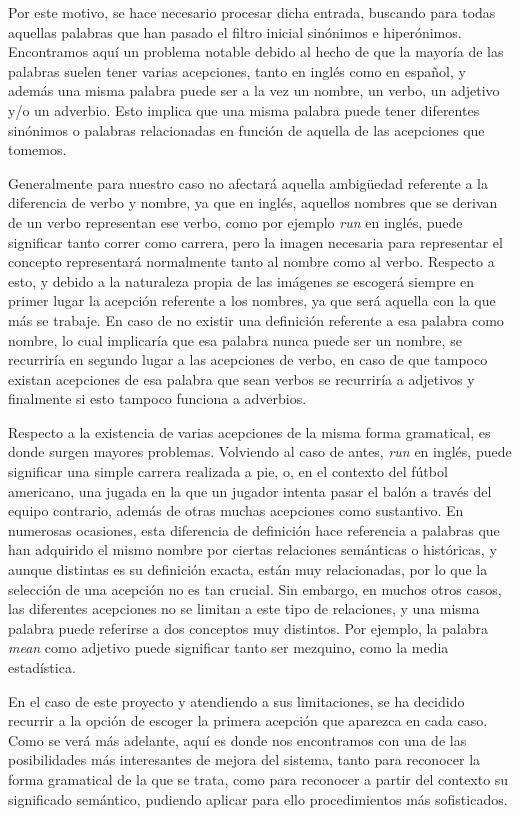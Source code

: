 Por este motivo, se hace necesario procesar dicha entrada, buscando para todas aquellas palabras que han pasado el filtro inicial sinónimos e hiperónimos. Encontramos aquí un problema notable debido al hecho de que la mayoría de las palabras suelen tener varias acepciones, tanto en inglés como en español, y además una misma palabra puede ser a la vez un nombre, un verbo, un adjetivo y/o un adverbio. Esto implica que una misma palabra puede tener diferentes sinónimos o palabras relacionadas en función de aquella de las acepciones que tomemos.

Generalmente para nuestro caso no afectará aquella ambigüedad referente a la diferencia de verbo y nombre, ya que en inglés, aquellos nombres que se derivan de un verbo representan ese verbo, como por ejemplo \textit{run} en inglés, puede significar tanto correr como carrera, pero la imagen necesaria para representar el concepto representará normalmente tanto al nombre como al verbo. Respecto a esto, y debido a la naturaleza propia de las imágenes se escogerá siempre en primer lugar la acepción referente a los nombres, ya que será aquella con la que más se trabaje. En caso de no existir una definición referente a esa palabra como nombre, lo cual implicaría que esa palabra nunca puede ser un nombre, se recurriría en segundo lugar a las acepciones de verbo, en caso de que tampoco existan acepciones de esa palabra que sean verbos se recurriría a adjetivos y finalmente si esto tampoco funciona a adverbios. 

Respecto a la existencia de varias acepciones de la misma forma gramatical, es donde surgen mayores problemas. Volviendo al caso de antes, \textit{run} en inglés, puede significar una simple carrera realizada a pie, o, en el contexto del fútbol americano, una jugada en la que un jugador intenta pasar el balón a través del equipo contrario, además de otras muchas acepciones como sustantivo. En numerosas ocasiones, esta diferencia de definición hace referencia a palabras que han adquirido el mismo nombre por ciertas relaciones semánticas o históricas, y aunque distintas es su definición exacta, están muy relacionadas, por lo que la selección de una acepción no es tan crucial. Sin embargo, en muchos otros casos, las diferentes acepciones no se limitan a este tipo de relaciones, y una misma palabra puede referirse a dos conceptos muy distintos. Por ejemplo, la palabra \textit{mean} como adjetivo puede significar tanto ser mezquino, como la media estadística. 

En el caso de este proyecto y atendiendo a sus limitaciones, se ha decidido recurrir a la opción de escoger la primera acepción que aparezca en cada caso. Como se verá más adelante, aquí es donde nos encontramos con una de las posibilidades más interesantes de mejora del sistema, tanto para reconocer la forma gramatical de la que se trata, como para reconocer a partir del contexto su significado semántico, pudiendo aplicar para ello procedimientos más sofisticados. 


